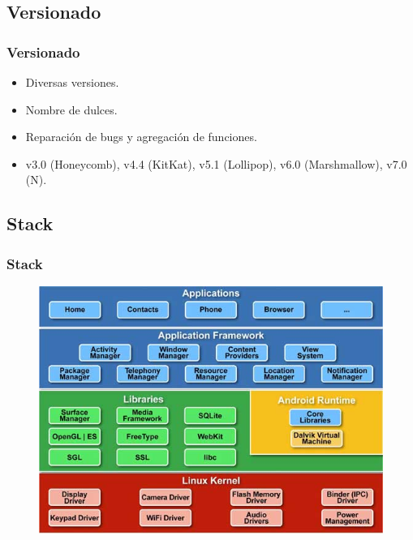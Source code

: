 \subsection{Versionado}
\begin{frame}
  \frametitle{Versionado}
  \begin{itemize}
    \item Diversas versiones.    
    
    \item Nombre de dulces.
    
    \item Reparación de bugs y agregación de funciones.    
    
    \item v3.0 (Honeycomb), v4.4 (KitKat), v5.1 (Lollipop), v6.0 (Marshmallow), v7.0 (N).
  \end{itemize}
\end{frame}

\subsection{Stack}
\begin{frame}
  \frametitle{Stack}
  \begin{figure}
      \includegraphics[scale=0.4]{images/stack.jpg}
  \end{figure}
\end{frame}

